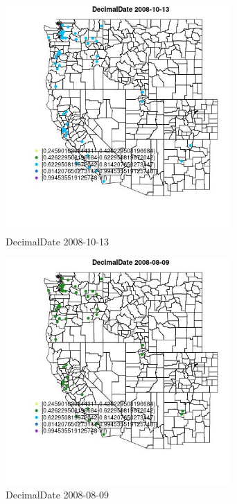 \begin{figure} 
\centering  
\includegraphics[width=0.77\textwidth]{Code_Outputs/Report_ML_input_PM25_Step4_part_e_de_duplicated_aves_MapObsDecimalDate2008-10-13.jpg} 
\caption{\label{fig:Report_ML_input_PM25_Step4_part_e_de_duplicated_avesMapObsDecimalDate2008-10-13}DecimalDate 2008-10-13} 
\end{figure} 
 

\clearpage 

\begin{figure} 
\centering  
\includegraphics[width=0.77\textwidth]{Code_Outputs/Report_ML_input_PM25_Step4_part_e_de_duplicated_aves_MapObsDecimalDate2008-08-09.jpg} 
\caption{\label{fig:Report_ML_input_PM25_Step4_part_e_de_duplicated_avesMapObsDecimalDate2008-08-09}DecimalDate 2008-08-09} 
\end{figure} 
 
